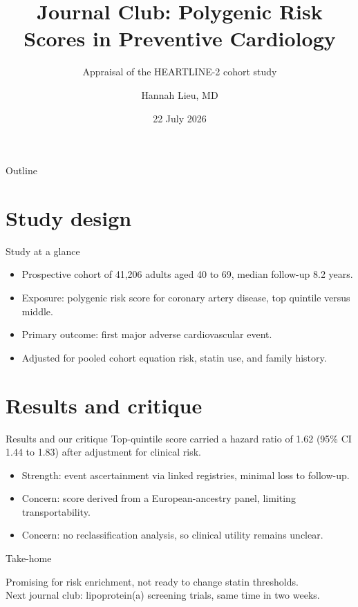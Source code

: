\documentclass[aspectratio=169]{beamer}
\title[PRS in Cardiology]{Journal Club: Polygenic Risk Scores in Preventive Cardiology}
\subtitle{Appraisal of the HEARTLINE-2 cohort study}
\author[H. Lieu]{Hannah Lieu, MD}
\institute[St.\ Aldric]{Cardiology Fellowship Program, St.\ Aldric Medical Center}
\date{22 July 2026}
\begin{document}
\begin{frame}
  \titlepage
\end{frame}

\begin{frame}{Outline}
  \tableofcontents
\end{frame}

\section{Study design}

\begin{frame}{Study at a glance}
  \begin{itemize}
    \item Prospective cohort of 41,206 adults aged 40 to 69, median follow-up 8.2 years.
    \item Exposure: polygenic risk score for coronary artery disease, top quintile versus middle.
    \item Primary outcome: first major adverse cardiovascular event.
    \item Adjusted for pooled cohort equation risk, statin use, and family history.
  \end{itemize}
\end{frame}

\section{Results and critique}

\begin{frame}{Results and our critique}
  Top-quintile score carried a hazard ratio of 1.62 (95\% CI 1.44 to 1.83)
  after adjustment for clinical risk.
  \begin{itemize}
    \item Strength: event ascertainment via linked registries, minimal loss to follow-up.
    \item Concern: score derived from a European-ancestry panel, limiting transportability.
    \item Concern: no reclassification analysis, so clinical utility remains unclear.
  \end{itemize}
\end{frame}

\begin{frame}{Take-home}
  \begin{center}
    {\Large Promising for risk enrichment, not ready to change statin thresholds.}\\[1em]
    Next journal club: lipoprotein(a) screening trials, same time in two weeks.
  \end{center}
\end{frame}
\end{document}
